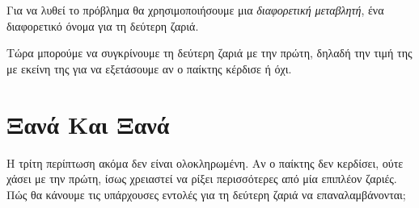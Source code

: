 \documentclass[a4paper,11pt,oneside]{book}
\begin{document}
\clearpage
{}%
\vspace{-3\parskip}%
Για να λυθεί το πρόβλημα θα χρησιμοποιήσουμε μια \emph{διαφορετική μεταβλητή}, ένα διαφορετικό όνομα για τη δεύτερη ζαριά.


Τώρα μπορούμε να συγκρίνουμε τη δεύτερη ζαριά με την πρώτη, δηλαδή την τιμή της  με εκείνη της  για να εξετάσουμε αν ο παίκτης κέρδισε ή όχι.



\section{Ξανά Και Ξανά}

\begin{question}
Η τρίτη περίπτωση ακόμα δεν είναι ολοκληρωμένη. Αν ο παίκτης δεν κερδίσει, ούτε χάσει με την πρώτη, ίσως χρειαστεί να ρίξει περισσότερες από μία επιπλέον ζαριές. Πώς θα κάνουμε τις υπάρχουσες εντολές για τη δεύτερη ζαριά να επαναλαμβάνονται; 
\end{question}
\end{document}
